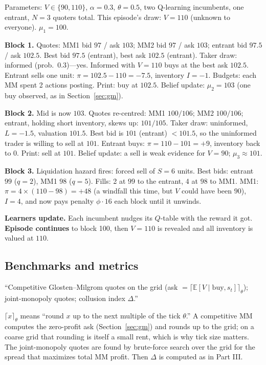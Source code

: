 \documentclass[11pt]{article}
\newcommand{\E}{\mathbb{E}}
\begin{document}
\begin{example}
Parameters: $V\in\{90,110\}$, $\alpha=0.3$, $\theta=0.5$, two Q-learning incumbents, one entrant, $N=3$ quoters total. This episode's draw: $V=110$ (unknown to everyone). $\mu_1=100$.

\textbf{Block 1.} Quotes: MM1 bid $97$ / ask $103$; MM2 bid $97$ / ask $103$; entrant bid $97.5$ / ask $102.5$. Best bid $97.5$ (entrant), best ask $102.5$ (entrant). Taker draw: informed (prob.\ $0.3$)---yes. Informed with $V=110$ buys at the best ask $102.5$. Entrant sells one unit: $\pi=102.5-110=-7.5$, inventory $I=-1$. Budgets: each MM spent 2 actions posting. Print: buy at $102.5$. Belief update: $\mu_2=103$ (one buy observed, as in Section~\ref{sec:gm}).

\textbf{Block 2.} Mid is now $103$. Quotes re-centred: MM1 $100/106$; MM2 $100/106$; entrant, holding short inventory, skews up: $101/105$. Taker draw: uninformed, $L=-1.5$, valuation $101.5$. Best bid is $101$ (entrant) $<101.5$, so the uninformed trader is willing to sell at $101$. Entrant buys: $\pi=110-101=+9$, inventory back to $0$. Print: sell at $101$. Belief update: a sell is weak evidence for $V=90$; $\mu_3\approx101$.

\textbf{Block 3.} Liquidation hazard fires: forced sell of $S=6$ units. Best bids: entrant $99$ ($q=2$), MM1 $98$ ($q=5$). Fills: 2 at $99$ to the entrant, 4 at $98$ to MM1. MM1: $\pi=4\times(110-98)=+48$ (a windfall this time, but $V$ could have been $90$), $I=4$, and now pays penalty $\phi\cdot16$ each block until it unwinds.

\textbf{Learners update.} Each incumbent nudges its $Q$-table with the reward it got. \textbf{Episode continues} to block 100, then $V=110$ is revealed and all inventory is valued at $110$.
\end{example}

\subsection{Benchmarks and metrics}
\begin{deliverable}
``Competitive Glosten--Milgrom quotes on the grid (ask $=\lceil\E[V\mid\text{buy},s_t]\rceil_\theta$); joint-monopoly quotes; collusion index $\Delta$.''
\end{deliverable}
$\lceil x\rceil_\theta$ means ``round $x$ up to the next multiple of the tick $\theta$.'' A competitive MM computes the zero-profit ask (Section~\ref{sec:gm}) and rounds up to the grid; on a coarse grid that rounding is itself a small rent, which is why tick size matters. The joint-monopoly quotes are found by brute-force search over the grid for the spread that maximizes total MM profit. Then $\Delta$ is computed as in Part III.
\end{document}
